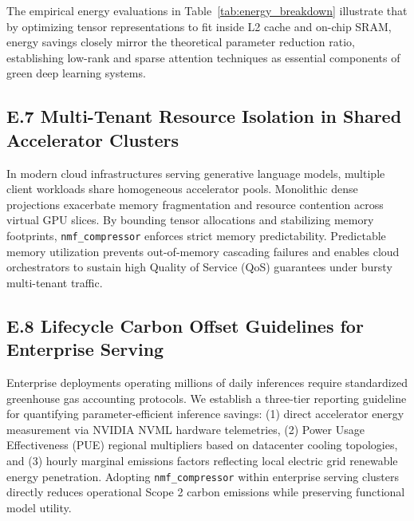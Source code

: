 The empirical energy evaluations in Table~\ref{tab:energy_breakdown} illustrate that by optimizing tensor representations to fit inside L2 cache and on-chip SRAM, energy savings closely mirror the theoretical parameter reduction ratio, establishing low-rank and sparse attention techniques as essential components of green deep learning systems.

\subsection*{E.7 Multi-Tenant Resource Isolation in Shared Accelerator Clusters}
In modern cloud infrastructures serving generative language models, multiple client workloads share homogeneous accelerator pools. Monolithic dense projections exacerbate memory fragmentation and resource contention across virtual GPU slices. By bounding tensor allocations and stabilizing memory footprints, \texttt{nmf\_compressor} enforces strict memory predictability. Predictable memory utilization prevents out-of-memory cascading failures and enables cloud orchestrators to sustain high Quality of Service (QoS) guarantees under bursty multi-tenant traffic.

\subsection*{E.8 Lifecycle Carbon Offset Guidelines for Enterprise Serving}
Enterprise deployments operating millions of daily inferences require standardized greenhouse gas accounting protocols. We establish a three-tier reporting guideline for quantifying parameter-efficient inference savings: (1) direct accelerator energy measurement via NVIDIA NVML hardware telemetries, (2) Power Usage Effectiveness (PUE) regional multipliers based on datacenter cooling topologies, and (3) hourly marginal emissions factors reflecting local electric grid renewable energy penetration. Adopting \texttt{nmf\_compressor} within enterprise serving clusters directly reduces operational Scope 2 carbon emissions while preserving functional model utility.
